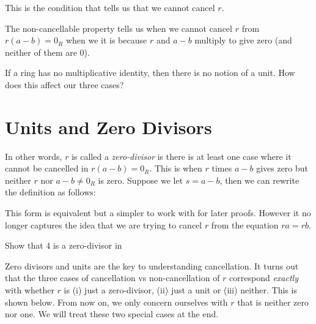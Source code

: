 This is the condition that tells us that we cannot cancel $r$.

The non-cancellable property tells us when we cannot cancel $r$ from $r(a-b) = 0_R$ when we 
it is because $r$ and $a-b$ multiply to give zero (and neither of them are 0). 

\frmrule

\begin{example}
If a ring has no multiplicative identity, then there is no notion
of a unit. How does this affect our three cases?
\end{example} 




\section{Units and Zero Divisors}




In other words, $r$ is called a \textit{zero-divisor} is there is at least one case 
where it cannot be cancelled in $r(a-b) = 0_R$. This is when $r$ times $a-b$ gives zero but neither $r$ nor 
$a-b \neq 0_R$ is zero. Suppose we let $s = a - b$, then we can rewrite the definition as follows: 


This form is equivalent but a simpler to work with for later proofs. However it no longer captures the 
idea that we are trying to cancel $r$ from the equation $ra = rb$.

\frmrule

\begin{example}
Show that 4 is a zero-divisor in 
\end{example}


\frmrule

Zero divisors and units are the key to understanding cancellation. It turns out that
the three cases of cancellation vs non-cancellation of $r$ correspond \textit{exactly} with whether 
$r$ is (i) just a zero-divisor, (ii) just a unit or (iii) neither. This is shown below.
From now on, we only concern ourselves with $r$ that is neither zero nor one. We will treat 
these two special cases at the end. 


